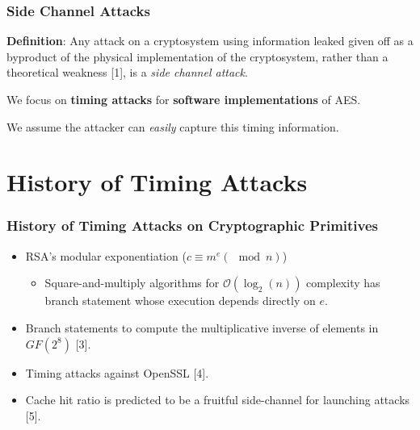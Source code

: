 \documentclass[9pt,handout]{beamer}
\begin{document}
\begin{frame}
	\frametitle{Side Channel Attacks}
	\textbf{Definition}: Any attack on a cryptosystem using information leaked given off as a byproduct of the physical implementation of the cryptosystem, rather than a theoretical weakness [1], is a \emph{side channel attack}.

	\bigskip

	We focus on \textbf{timing attacks} for \textbf{software implementations} of AES.

	\bigskip

	We assume the attacker can \emph{easily} capture this timing information.
\end{frame}

\section{History of Timing Attacks}
\begin{frame}
	\frametitle{History of Timing Attacks on Cryptographic Primitives}
	\begin{itemize}
		\item RSA's modular exponentiation ($c \equiv m^e (\mod n)$)
		\begin{itemize}
			\item Square-and-multiply algorithms for $\mathcal{O}(\log_2(n))$ complexity has branch statement whose execution depends directly on $e$.
		\end{itemize}
		\item Branch statements to compute the multiplicative inverse of elements in $GF(2^8)$ [3].
		\item Timing attacks against OpenSSL [4].
		\item Cache hit ratio is predicted to be a fruitful side-channel for launching attacks [5].
	\end{itemize}
\end{frame}
\end{document}
